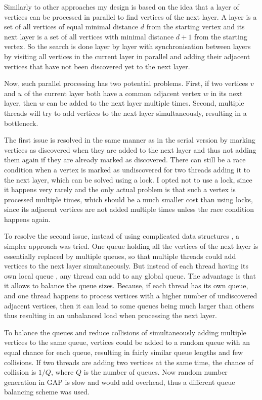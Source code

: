 \documentclass{report}
\theoremstyle{plain}
\theoremstyle{definition}
\theoremstyle{remark}
\begin{document}
Similarly to other approaches my design is based on the idea that a layer of vertices can be processed in parallel to find vertices of the next layer. A layer is a set of all vertices of equal minimal distance $d$ from the starting vertex and its next layer is a set of all vertices with minimal distance $d + 1$ from the starting vertex. So the search is done layer by layer with synchronisation between layers by visiting all vertices in the current layer in parallel and adding their adjacent vertices that have not been discovered yet to the next layer.

Now, such parallel processing has two potential problems. First, if two vertices $v$ and $u$ of the current layer both have a common adjacent vertex $w$ in its next layer, then $w$ can be added to the next layer multiple times. Second, multiple threads will try to add vertices to the next layer simultaneously, resulting in a bottleneck.

The first issue is resolved in the same manner as in the serial version by marking vertices as discovered when they are added to the next layer and thus not adding them again if they are already marked as discovered. There can still be a race condition when a vertex is marked as undiscovered for two threads adding it to the next layer, which can be solved using a lock. I opted not to use a lock, since it happens very rarely and the only actual problem is that such a vertex is processed multiple times, which should be a much smaller cost than using locks, since its adjacent vertices are not added multiple times unless the race condition happens again.

To resolve the second issue, instead of using complicated data structures \cite{Leiserson}, a simpler approach was tried. One queue holding all the vertices of the next layer is essentially replaced by multiple queues, so that multiple threads could add vertices to the next layer simultaneously. But instead of each thread having its own local queue \cite{cong2008solving, zhang2006parallel}, any thread can add to any global queue. The advantage is that it allows to balance the queue sizes. Because, if each thread has its own queue, and one thread happens to process vertices with a higher number of undiscovered adjacent vertices, then it can lead to some queues being much larger than others thus resulting in an unbalanced load when processing the next layer.

To balance the queues and reduce collisions of simultaneously adding multiple vertices to the same queue, vertices could be added to a random queue with an equal chance for each queue, resulting in fairly similar queue lengths and few collisions. If two threads are adding two vertices at the same time, the chance of collision is $1/Q$, where $Q$ is the number of queues. Now random number generation in GAP is slow and would add overhead, thus a different queue balancing scheme was used.
\end{document}
